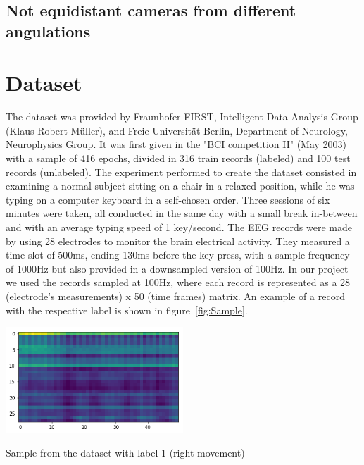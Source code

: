 \documentclass[10pt,conference,compsocconf]{IEEEtran}
\begin{document}
\subsection{Not equidistant cameras from different angulations}
\section{Dataset}
\label{sec:data-analysis}
The dataset was provided by Fraunhofer-FIRST, Intelligent Data Analysis Group (Klaus-Robert M\"uller), and Freie Universit\"at Berlin, Department of Neurology, Neurophysics Group. It was first given in the "BCI competition II" (May 2003) with a sample of 416 epochs, divided in 316 train records (labeled) and 100 test records (unlabeled).
The experiment performed to create the dataset consisted in examining a normal subject sitting on a chair in a relaxed position, while he was typing on a computer keyboard in a self-chosen order. Three sessions of six minutes were taken, all conducted in the same day with a small break in-between and with an average typing speed of 1 key/second. The EEG records were made by using 28 electrodes to monitor the brain electrical activity. They measured a time slot of 500ms, ending 130ms before the key-press, with a sample frequency of 1000Hz but also provided in a downsampled version of 100Hz. In our project we used the records sampled at 100Hz, where each record is represented as a 28 (electrode's measurements) x 50 (time frames) matrix. 
An example of a record with the respective label is shown in figure~\ref{fig:Sample}.

\begin{center}
	\captionsetup{type=figure}
	\includegraphics[width=0.5\textwidth]{img/sample.png}
	\caption {Sample from the dataset with label 1 (right movement)}
	\label{fig:Sample}
\end{center}
\end{document}

